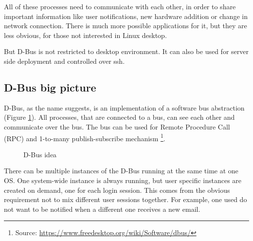 \documentclass[a4paper,10.5pt]{article}
\begin{document}
All of these processes need to communicate with each other, in order to share important information like user notifications, new hardware addition or change in network connection. There is much more possible applications for it, but they are less obvious, for those not interested in Linux desktop.

But D-Bus is not restricted to desktop environment. It can also be used for server side deployment and controlled over ssh.

\subsection{D-Bus big picture}

D-Bus, as the name suggests, is an implementation of a software bus abstraction (Figure \ref{fig:dbus}). All processes, that are connected to a bus, can see each other and communicate over the bus. The bus can be used for Remote Procedure Call (RPC) and 1-to-many publish-subscribe mechanism \footnote{Source: \url{https://www.freedesktop.org/wiki/Software/dbus/}}.

\begin{figure}[h!]
  \begin{center}
    \caption{D-Bus idea}
    \label{fig:dbus}
  \end{center}
\end{figure}

There can be multiple instances of the D-Bus running at the same time at one OS. One system-wide instance is always running, but user specific instances are created on demand, one for each login session. This comes from the obvious requirement not to mix different user sessions together. For example, one used do not want to be notified when a different one receives a new email.
\end{document}
